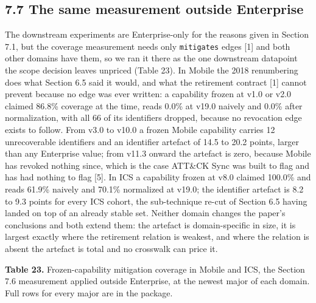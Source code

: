 \documentclass[11pt,a4paper]{article}
\begin{document}
\subsection{7.7 The same measurement outside Enterprise}

The downstream experiments are Enterprise-only for the reasons given in Section 7.1, but the coverage measurement needs only \texttt{mitigates} edges [1] and both other domains have them, so we ran it there as the one downstream datapoint the scope decision leaves unpriced (Table 23). In Mobile the 2018 renumbering does what Section 6.5 said it would, and what the retirement contract [1] cannot prevent because no edge was ever written: a capability frozen at v1.0 or v2.0 claimed 86.8\% coverage at the time, reads 0.0\% at v19.0 naively and 0.0\% after normalization, with all 66 of its identifiers dropped, because no revocation edge exists to follow. From v3.0 to v10.0 a frozen Mobile capability carries 12 unrecoverable identifiers and an identifier artefact of 14.5 to 20.2 points, larger than any Enterprise value; from v11.3 onward the artefact is zero, because Mobile has revoked nothing since, which is the case ATT\&CK Sync was built to flag and has had nothing to flag [5]. In ICS a capability frozen at v8.0 claimed 100.0\% and reads 61.9\% naively and 70.1\% normalized at v19.0; the identifier artefact is 8.2 to 9.3 points for every ICS cohort, the sub-technique re-cut of Section 6.5 having landed on top of an already stable set. Neither domain changes the paper's conclusions and both extend them: the artefact is domain-specific in size, it is largest exactly where the retirement relation is weakest, and where the relation is absent the artefact is total and no crosswalk can price it.

\textbf{Table 23.} Frozen-capability mitigation coverage in Mobile and ICS, the Section 7.6 measurement applied outside Enterprise, at the newest major of each domain. Full rows for every major are in the package.
\end{document}

